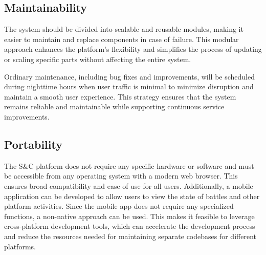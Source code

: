 \subsection{Maintainability}

The system should be divided into scalable and reusable modules, making it easier to maintain and replace components in case of failure. This modular approach enhances the platform's flexibility and simplifies the process of updating or scaling specific parts without affecting the entire system. 

Ordinary maintenance, including bug fixes and improvements, will be scheduled during nighttime hours when user traffic is minimal to minimize disruption and maintain a smooth user experience. This strategy ensures that the system remains reliable and maintainable while supporting continuous service improvements.

\subsection{Portability}

The S\&C platform does not require any specific hardware or software and must be accessible from any operating system with a modern web browser. This ensures broad compatibility and ease of use for all users. Additionally, a mobile application can be developed to allow users to view the state of battles and other platform activities. Since the mobile app does not require any specialized functions, a non-native approach can be used. This makes it feasible to leverage cross-platform development tools, which can accelerate the development process and reduce the resources needed for maintaining separate codebases for different platforms.
